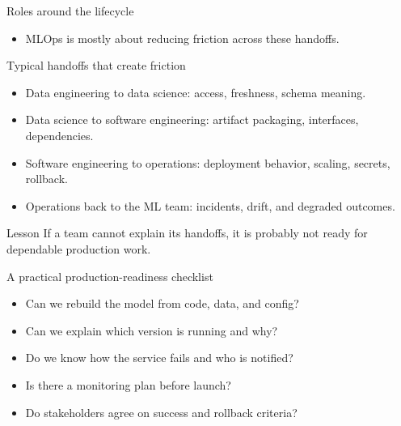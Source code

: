 \begin{frame}{Roles around the lifecycle}
\centering
{}
\vspace{0.5em}
\begin{itemize}
\item MLOps is mostly about reducing friction across these handoffs.
\end{itemize}
\coursefooter
\end{frame}

\begin{frame}{Typical handoffs that create friction}
\begin{itemize}
\item Data engineering to data science: access, freshness, schema meaning.
\item Data science to software engineering: artifact packaging, interfaces, dependencies.
\item Software engineering to operations: deployment behavior, scaling, secrets, rollback.
\item Operations back to the ML team: incidents, drift, and degraded outcomes.
\end{itemize}
\begin{block}{Lesson}
If a team cannot explain its handoffs, it is probably not ready for dependable production work.
\end{block}
\coursefooter
\end{frame}

\begin{frame}{A practical production-readiness checklist}
\begin{itemize}
\item Can we rebuild the model from code, data, and config?
\item Can we explain which version is running and why?
\item Do we know how the service fails and who is notified?
\item Is there a monitoring plan before launch?
\item Do stakeholders agree on success and rollback criteria?
\end{itemize}
\coursefooter
\end{frame}

